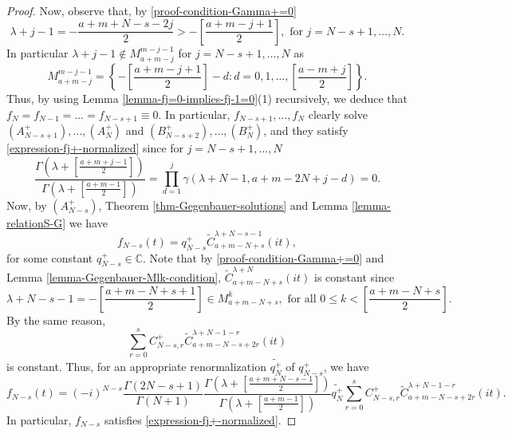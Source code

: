 \documentclass[12pt, pdflatex, a4paper]{article}
\theoremstyle{plain}
\theoremstyle{definition}
\def\C{{\mathbb C}}
\def\Geg{\widetilde{C}}
\begin{document}
\begin{proof}
Now, observe that, by \eqref{proof-condition-Gamma+=0}
\begin{equation*}
\lambda+j-1 =-\frac{a+m+N-s-2j}{2} > -\left[\frac{a+m-j+1}{2}\right], \text{ for } j = N-s+1, \ldots, N.
\end{equation*}
In particular $\lambda+j-1 \notin M_{a+m-j}^{m-j-1}$ for $j = N-s+1, \ldots, N$ as
\begin{equation*}
M_{a+m-j}^{m-j-1} = \left\{-\left[\frac{a+m-j+1}{2}\right] - d : d= 0, 1, \ldots, \left[\frac{a-m+j}{2}\right]\right\}. 
\end{equation*}
Thus, by using Lemma \ref{lemma-fj=0-implies-fj-1=0}(1) recursively, we deduce that $f_N = f_{N-1} = \ldots = f_{N-s+1} \equiv 0$. In particular, $f_{N-s+1}, \ldots, f_N$ 
clearly solve $(A_{N-s+1}^+), \ldots, (A_N^+)$ and $(B_{N-s+2}^+), \ldots, (B_N^+)$, and they
satisfy \eqref{expression-fj+-normalized} since for $j = N-s+1, \ldots, N$
\begin{equation*}
\frac{\Gamma\left(\lambda+\left[\frac{a+m+j-1}{2}\right]\right)}{\Gamma\left(\lambda+\left[\frac{a+m-1}{2}\right]\right)} = \prod_{d=1}^{j}\gamma(\lambda+N-1, a+m-2N+j-d) = 0.
\end{equation*}
Now, by $(A_{N-s}^+)$, Theorem \ref{thm-Gegenbauer-solutions} and Lemma \ref{lemma-relationS-G} we have
\begin{equation*}
f_{N-s}(t) = q_{N-s}^+\Geg_{a+m-N+s}^{\lambda+N-s-1}(it),
\end{equation*}
for some constant $q_{N-s}^+ \in \C$. Note that by \eqref{proof-condition-Gamma+=0} and Lemma \ref{lemma-Gegenbauer-Mlk-condition}, $\Geg_{a+m-N+s}^{\lambda+N}(it)$ is constant since
\begin{equation*}
\lambda+N-s-1 = -\left[\frac{a+m-N+s+1}{2}\right] \in M_{a+m-N+s}^{k}, \text{ for all } 0 \leq k < \left[\frac{a+m-N+s}{2}\right].
\end{equation*}
By the same reason,
\begin{equation*}
\sum_{r=0}^{s}C_{N-s,r}^+\Geg_{a+m-N-s+2r}^{\lambda+N-1-r}(it)
\end{equation*}
is constant. Thus, for an appropriate renormalization $\widetilde{q_N^+}$ of $q_{N-s}^+$, we have
\begin{equation*}
f_{N-s}(t) = (-i)^{N-s}\frac{\Gamma(2N-s+1)}{\Gamma(N+1)}\frac{\Gamma\left(\lambda+\left[\frac{a+m+N-s-1}{2}\right]\right)}{\Gamma\left(\lambda+\left[\frac{a+m-1}{2}\right]\right)}\widetilde{q_N^+}\sum_{r=0}^{s}C_{N-s,r}^+\Geg_{a+m-N-s+2r}^{\lambda+N-1-r}(it).
\end{equation*}
In particular, $f_{N-s}$ satisfies \eqref{expression-fj+-normalized}.


\end{proof}
\end{document}

